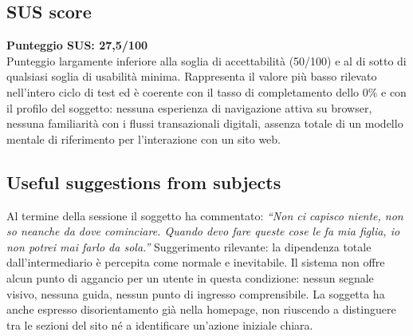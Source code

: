 \documentclass[11pt,a4paper]{article}
\begin{document}
\subsection*{SUS score}
\begin{tcolorbox}[colback=backgroundColor,colframe=borderColor,arc=2mm]
\textbf{Punteggio SUS: 27,5/100}\\[0.2cm]
\small Punteggio largamente inferiore alla soglia di
accettabilità (50/100) e al di sotto di qualsiasi soglia
di usabilità minima. Rappresenta il valore più basso
rilevato nell'intero ciclo di test ed è coerente con il
tasso di completamento dello 0\% e con il profilo del
soggetto: nessuna esperienza di navigazione attiva su
browser, nessuna familiarità con i flussi transazionali
digitali, assenza totale di un modello mentale di
riferimento per l'interazione con un sito web.
\end{tcolorbox}

\subsection*{Useful suggestions from subjects}
\begin{tcolorbox}[colback=backgroundColor,colframe=borderColor,arc=2mm]
Al termine della sessione il soggetto ha commentato:
\textit{``Non ci capisco niente, non so neanche da dove
cominciare. Quando devo fare queste cose le fa mia figlia,
io non potrei mai farlo da sola.''}
Suggerimento rilevante: la dipendenza totale dall'intermediario
è percepita come normale e inevitabile. Il sistema non offre
alcun punto di aggancio per un utente in questa condizione:
nessun segnale visivo, nessuna guida, nessun punto di
ingresso comprensibile. La soggetta ha anche espresso
disorientamento già nella homepage, non riuscendo a
distinguere tra le sezioni del sito né a identificare
un'azione iniziale chiara.
\end{tcolorbox}
\end{document}
